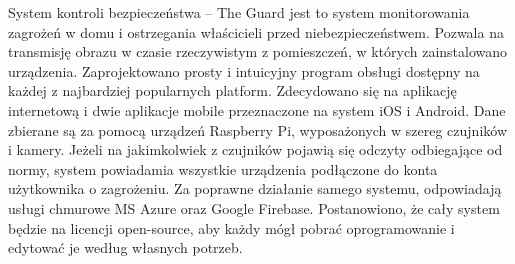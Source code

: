 System kontroli bezpieczeństwa – The Guard jest to system monitorowania zagrożeń w domu i ostrzegania właścicieli przed niebezpieczeństwem. Pozwala na transmisję obrazu w czasie rzeczywistym z pomieszczeń, w których zainstalowano urządzenia. 
Zaprojektowano prosty i intuicyjny program obsługi dostępny na każdej z najbardziej popularnych platform. Zdecydowano się na aplikację internetową i dwie aplikacje mobile przeznaczone na system iOS i Android. Dane zbierane są za pomocą urządzeń Raspberry Pi, wyposażonych w szereg czujników i kamery. Jeżeli na jakimkolwiek z czujników pojawią się odczyty odbiegające od normy, system powiadamia wszystkie urządzenia podłączone do konta użytkownika o zagrożeniu. Za poprawne działanie samego systemu, odpowiadają usługi chmurowe MS Azure oraz Google Firebase. Postanowiono, że cały system będzie na licencji open-source, aby każdy mógł pobrać oprogramowanie i edytować je według własnych potrzeb.

